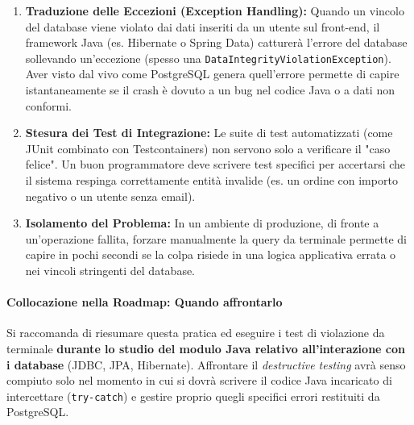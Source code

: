\begin{enumerate}
    \item \textbf{Traduzione delle Eccezioni (Exception Handling):} Quando un vincolo del database viene violato dai dati inseriti da un utente sul front-end, il framework Java (es. Hibernate o Spring Data) catturerà l'errore del database sollevando un'eccezione (spesso una \texttt{DataIntegrityViolationException}). Aver visto dal vivo come PostgreSQL genera quell'errore permette di capire istantaneamente se il crash è dovuto a un bug nel codice Java o a dati non conformi.
    \item \textbf{Stesura dei Test di Integrazione:} Le suite di test automatizzati (come JUnit combinato con Testcontainers) non servono solo a verificare il "caso felice". Un buon programmatore deve scrivere test specifici per accertarsi che il sistema respinga correttamente entità invalide (es. un ordine con importo negativo o un utente senza email).
    \item \textbf{Isolamento del Problema:} In un ambiente di produzione, di fronte a un'operazione fallita, forzare manualmente la query da terminale permette di capire in pochi secondi se la colpa risiede in una logica applicativa errata o nei vincoli stringenti del database.
\end{enumerate}

\paragraph{Collocazione nella Roadmap: Quando affrontarlo}
Si raccomanda di riesumare questa pratica ed eseguire i test di violazione da terminale \textbf{durante lo studio del modulo Java relativo all'interazione con i database} (JDBC, JPA, Hibernate). Affrontare il \textit{destructive testing} avrà senso compiuto solo nel momento in cui si dovrà scrivere il codice Java incaricato di intercettare (\texttt{try-catch}) e gestire proprio quegli specifici errori restituiti da PostgreSQL.